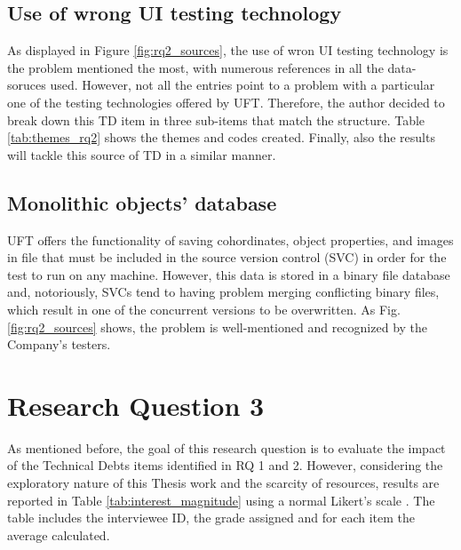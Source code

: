\subsection{Use of wrong UI testing technology}
As displayed in Figure \ref{fig:rq2_sources}, the use of wron UI testing technology is the problem mentioned the most, with numerous references in all the data-soruces used. However, not all the entries point to a problem with a particular one of the testing technologies offered by UFT. Therefore, the author decided to break down this TD item in three sub-items that match the structure. Table \ref{tab:themes_rq2} shows the themes and codes created.
Finally, also the results will tackle this source of TD in a similar manner.


\subsection{Monolithic objects’ database}
UFT offers the functionality of saving cohordinates, object properties, and images in file that must be included in the source version control (SVC) in order for the test to run on any machine. However, this data is stored in a binary file database and, notoriously, SVCs tend to having problem merging conflicting binary files, which result in one of the concurrent versions to be overwritten. As Fig. \ref{fig:rq2_sources} shows, the problem is well-mentioned and recognized by the Company's testers.

\section{Research Question 3}
As mentioned before, the goal of this research question is to evaluate the impact of the Technical Debts items identified in RQ 1 and 2. However, considering the exploratory nature of this Thesis work and the scarcity of resources, results are reported in Table \ref{tab:interest_magnitude} using a normal Likert's scale \cite{likert-scale}. The table includes the interviewee ID, the grade assigned and for each item the average calculated.

